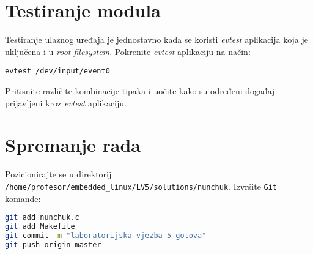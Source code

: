 \documentclass[11pt]{article}
\begin{document}
\section{Testiranje modula}
Testiranje ulaznog uređaja je jednostavno kada se koristi \textit{evtest}
aplikacija koja je uključena i u \textit{root filesystem}.
Pokrenite \textit{evtest} aplikaciju na način:
\begin{lstlisting}
evtest /dev/input/event0
\end{lstlisting}
Pritisnite različite kombinacije tipaka i uočite kako su određeni događaji
prijavljeni kroz \textit{evtest} aplikaciju.

\section{Spremanje rada}
Pozicionirajte se u direktorij \texttt{/home/profesor/embedded\_linux/LV5/solutions/nunchuk}.
Izvršite \texttt{Git} komande:
\begin{lstlisting}[language=bash]
git add nunchuk.c
git add Makefile
git commit -m "laboratorijska vjezba 5 gotova"
git push origin master
\end{lstlisting}
\end{document}
